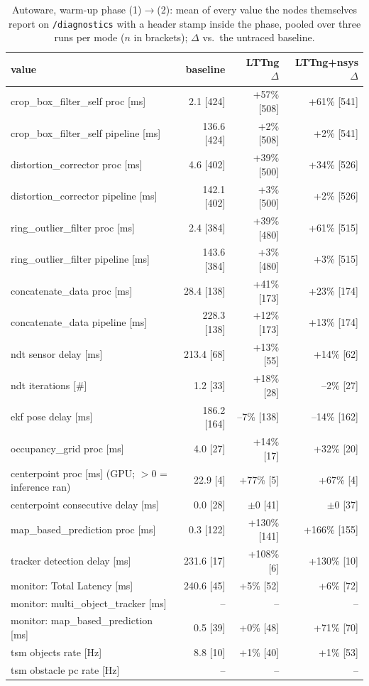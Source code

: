 \begin{table}[t]\centering\scriptsize
\caption{Autoware, warm-up phase (1)$\rightarrow$(2): mean of every value the nodes themselves report on \texttt{/diagnostics} with a header stamp inside the phase, pooled over three runs per mode ($n$ in brackets); $\Delta$ vs.\ the untraced baseline.}
\label{tab:aw-phase-warmup}
\begin{tabular}{lrrr}
\toprule
value & baseline & LTTng $\Delta$ & LTTng+nsys $\Delta$ \\
\midrule
crop\_box\_filter\_self proc [ms] & 2.1 [424] & +57\% [508] & +61\% [541] \\
crop\_box\_filter\_self pipeline [ms] & 136.6 [424] & +2\% [508] & +2\% [541] \\
distortion\_corrector proc [ms] & 4.6 [402] & +39\% [500] & +34\% [526] \\
distortion\_corrector pipeline [ms] & 142.1 [402] & +3\% [500] & +2\% [526] \\
ring\_outlier\_filter proc [ms] & 2.4 [384] & +39\% [480] & +61\% [515] \\
ring\_outlier\_filter pipeline [ms] & 143.6 [384] & +3\% [480] & +3\% [515] \\
concatenate\_data proc [ms] & 28.4 [138] & +41\% [173] & +23\% [174] \\
concatenate\_data pipeline [ms] & 228.3 [138] & +12\% [173] & +13\% [174] \\
ndt sensor delay [ms] & 213.4 [68] & +13\% [55] & +14\% [62] \\
ndt iterations [\#] & 1.2 [33] & +18\% [28] & --2\% [27] \\
ekf pose delay [ms] & 186.2 [164] & --7\% [138] & --14\% [162] \\
occupancy\_grid proc [ms] & 4.0 [27] & +14\% [17] & +32\% [20] \\
centerpoint proc [ms] (GPU; $>$0 = inference ran) & 22.9 [4] & +77\% [5] & +67\% [4] \\
centerpoint consecutive delay [ms] & 0.0 [28] & $\pm$0 [41] & $\pm$0 [37] \\
map\_based\_prediction proc [ms] & 0.3 [122] & +130\% [141] & +166\% [155] \\
tracker detection delay [ms] & 231.6 [17] & +108\% [6] & +130\% [10] \\
monitor: Total Latency [ms] & 240.6 [45] & +5\% [52] & +6\% [72] \\
monitor: multi\_object\_tracker [ms] & -- & -- & -- \\
monitor: map\_based\_prediction [ms] & 0.5 [39] & +0\% [48] & +71\% [70] \\
tsm objects rate [Hz] & 8.8 [10] & +1\% [40] & +1\% [53] \\
tsm obstacle pc rate [Hz] & -- & -- & -- \\
\bottomrule
\end{tabular}
\end{table}
